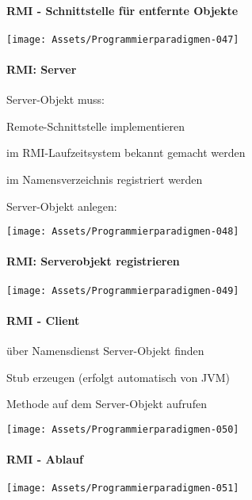 \documentclass[10pt]{article}
\begin{document}
\paragraph{RMI - Schnittstelle für entfernte Objekte}
\begin{center}
  \centering
  \texttt{[image: Assets/Programmierparadigmen-047]}
\end{center}

\paragraph{RMI: Server}
Server-Objekt muss: 
\begin{itemize*}
  \item Remote-Schnittstelle implementieren
  \item im RMI-Laufzeitsystem bekannt gemacht werden
  \item im Namensverzeichnis registriert werden
\end{itemize*}
Server-Objekt anlegen: 
\begin{center}
  \centering
  \texttt{[image: Assets/Programmierparadigmen-048]}
\end{center}

\paragraph{RMI: Serverobjekt registrieren}
\begin{center}
  \centering
  \texttt{[image: Assets/Programmierparadigmen-049]}
\end{center}

\paragraph{RMI - Client}
\begin{itemize*}
  \item über Namensdienst Server-Objekt finden
  \item Stub erzeugen (erfolgt automatisch von JVM)
  \item Methode auf dem Server-Objekt aufrufen
\end{itemize*}
\begin{center}
  \centering
  \texttt{[image: Assets/Programmierparadigmen-050]}
\end{center}

\paragraph{RMI - Ablauf}
\begin{center}
  \centering
  \texttt{[image: Assets/Programmierparadigmen-051]}
\end{center}
\end{document}
